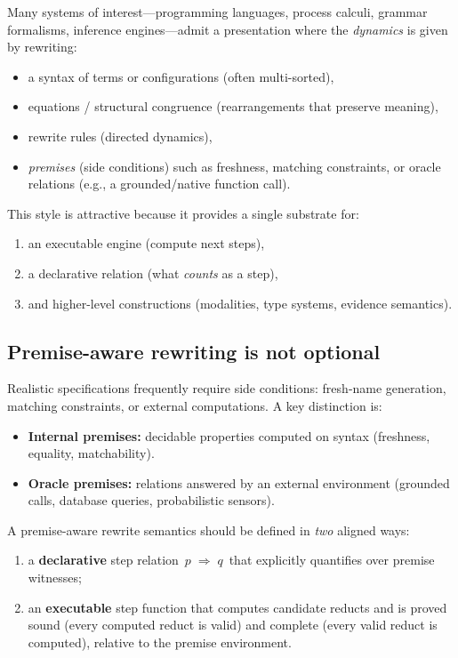 \documentclass[11pt]{article}
\newcommand{\Red}{\;\Rightarrow\;}
\theoremstyle{definition}
\begin{document}
Many systems of interest---programming languages, process calculi, grammar formalisms,
inference engines---admit a presentation where the \emph{dynamics} is given by rewriting:
\begin{itemize}[leftmargin=1.5em]
\item a syntax of terms or configurations (often multi-sorted),
\item equations / structural congruence (rearrangements that preserve meaning),
\item rewrite rules (directed dynamics),
\item \emph{premises} (side conditions) such as freshness, matching constraints,
or oracle relations (e.g., a grounded/native function call).
\end{itemize}

This style is attractive because it provides a single substrate for:
\begin{enumerate}[leftmargin=1.5em]
\item an executable engine (compute next steps),
\item a declarative relation (what \emph{counts} as a step),
\item and higher-level constructions (modalities, type systems, evidence semantics).
\end{enumerate}

\subsection{Premise-aware rewriting is not optional}

Realistic specifications frequently require side conditions:
fresh-name generation, matching constraints, or external computations.
A key distinction is:
\begin{itemize}[leftmargin=1.5em]
\item \textbf{Internal premises:} decidable properties computed on syntax (freshness, equality, matchability).
\item \textbf{Oracle premises:} relations answered by an external environment
(grounded calls, database queries, probabilistic sensors).
\end{itemize}

A premise-aware rewrite semantics should be defined in \emph{two} aligned ways:
\begin{enumerate}[leftmargin=1.5em]
\item a \textbf{declarative} step relation \,$p \Red q$\, that explicitly quantifies over premise witnesses;
\item an \textbf{executable} step function that computes candidate reducts and is proved
sound (every computed reduct is valid) and complete (every valid reduct is computed),
relative to the premise environment.
\end{enumerate}
\end{document}
